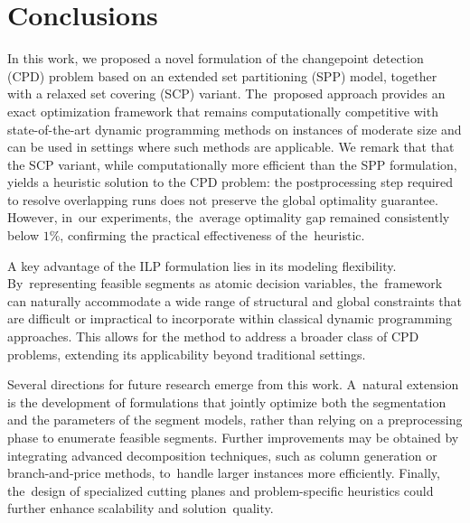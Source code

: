 \documentclass[mathematics,article,accept,pdftex,moreauthors]{Definitions/mdpi}
\begin{document}
\section{Conclusions}              			\label{sec:conclusions}

In this work, we proposed a novel formulation of the changepoint detection (CPD) problem based on an extended set partitioning (SPP) model, together with a relaxed set covering (SCP) variant. The~proposed approach provides an exact optimization framework that remains computationally competitive with state-of-the-art dynamic programming methods on instances of moderate size and can be used in settings where such methods are applicable.
We remark that that the SCP variant, while computationally more efficient than the SPP formulation, yields a heuristic solution to the CPD problem: the postprocessing step required to resolve overlapping runs does not preserve the global optimality guarantee. However, in~our experiments, the~average optimality gap remained consistently below $1\%$, confirming the practical effectiveness of the~heuristic.
	
A key advantage of the ILP formulation lies in its modeling flexibility. By~representing feasible segments as atomic decision variables, the~framework can naturally accommodate a wide range of structural and global constraints that are difficult or impractical to incorporate within classical dynamic programming approaches. This allows for the method to address a broader class of CPD problems, extending its applicability beyond traditional settings.


Several directions for future research emerge from this work. A~natural extension is the development of formulations that jointly optimize both the segmentation and the parameters of the segment models, rather than relying on a preprocessing phase to enumerate feasible segments. Further improvements may be obtained by integrating advanced decomposition techniques, such as column generation or branch-and-price methods, to~handle larger instances more efficiently. Finally, the~design of specialized cutting planes and problem-specific heuristics could further enhance scalability and solution~quality.
\end{document}
